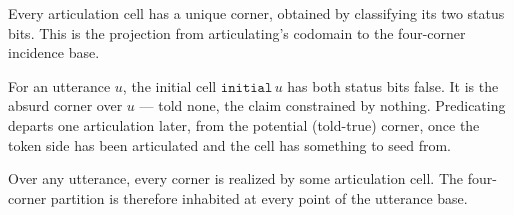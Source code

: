 \begin{proposition}\label{thm:articulation-cell-corner}\leanok{}
Every articulation cell has a unique corner, obtained by classifying its two
status bits. This is the projection from articulating's codomain to the
four-corner incidence base.
\end{proposition}

\begin{proposition}\label{thm:articulation-cell-initial}\leanok{}
For an utterance $u$, the initial cell $\texttt{initial}\,u$ has both status
bits false. It is the absurd corner over $u$ — told none, the claim
constrained by nothing. Predicating departs one articulation later, from the
potential (told-true) corner, once the token side has been articulated and the
cell has something to seed from.
\end{proposition}

\begin{proposition}\label{thm:corner-surjective}\leanok{}
Over any utterance, every corner is realized by some articulation cell. The
four-corner partition is therefore inhabited at every point of the utterance
base.
\end{proposition}
